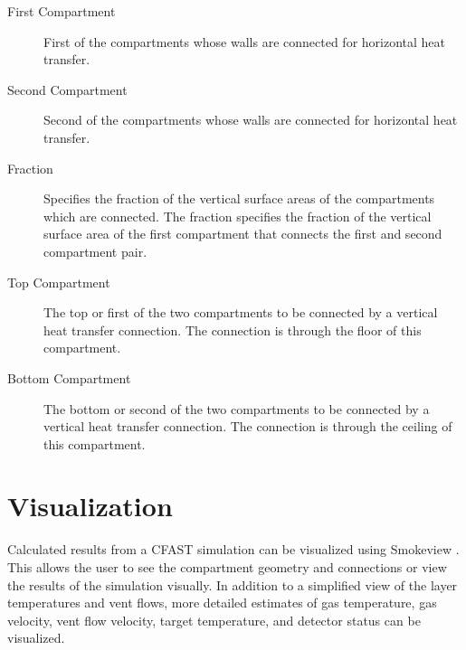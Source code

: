 \begin{description}
\item[First Compartment] First of the compartments whose walls are connected for horizontal heat transfer.

\item[Second Compartment] Second of the compartments whose walls are connected for horizontal heat transfer.

\item[Fraction] Specifies the fraction of the vertical surface areas of the compartments which are connected. The fraction specifies the fraction of the vertical surface area of the first compartment that connects the first and second compartment pair.

\item[Top Compartment] The top or first of the two compartments to be connected by a vertical heat transfer connection. The connection is through the floor of this compartment.

\item[Bottom Compartment] The bottom or second of the two compartments to be connected by a vertical heat transfer connection. The connection is through the ceiling of this compartment.
\end{description}





\chapter{Visualization}

Calculated results from a CFAST simulation can be visualized using Smokeview \cite{Smokeview_Users_Guide_6}. This allows the user to see the compartment geometry and connections or view the results of the simulation visually. In addition to a simplified view of the layer temperatures and vent flows, more detailed estimates of gas temperature, gas velocity, vent flow velocity, target temperature, and detector status can be visualized.


